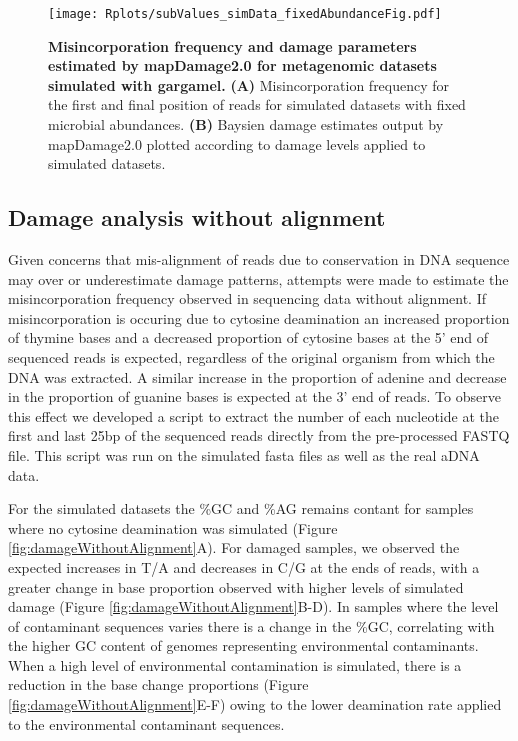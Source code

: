 \documentclass[12pt, a4paper]{article}
\begin{document}
\begin{figure}[ht!]
	\setlength{\abovecaptionskip}{6pt}
	\begin{center}
	\texttt{[image: Rplots/subValues\_simData\_fixedAbundanceFig.pdf]}
	\end{center}
	\small\caption[Misincorporation frequency and damage parameters estimated by mapDamage2.0 for metagenomic datasets simulated with gargamel.]{\textbf{Misincorporation frequency and damage parameters estimated by mapDamage2.0 for metagenomic datasets simulated with gargamel.} \textbf{(A)} Misincorporation frequency for the first and final position of reads for simulated datasets with fixed microbial abundances. \textbf{(B)} Baysien damage estimates output by mapDamage2.0 plotted according to damage levels applied to simulated datasets.}\label{fig:subValues_simDataFig}
\end{figure}
\clearpage

\subsection{Damage analysis without alignment}

Given concerns that mis-alignment of reads due to conservation in DNA sequence may over or underestimate damage patterns, attempts were made to estimate the misincorporation frequency observed in sequencing data without alignment. 
If misincorporation is occuring due to cytosine deamination an increased proportion of thymine bases and a decreased proportion of cytosine bases at the 5' end of sequenced reads is expected, regardless of the original organism from which the DNA was extracted. 
A similar increase in the proportion of adenine and decrease in the proportion of guanine bases is expected at the 3' end of reads. 
To observe this effect we developed a script to extract the number of each nucleotide at the first and last 25bp of the sequenced reads directly from the pre-processed FASTQ file. 
This script was run on the simulated fasta files as well as the real aDNA data.

For the simulated datasets the \%GC and \%AG remains contant for samples where no cytosine deamination was simulated (Figure \ref{fig:damageWithoutAlignment}A). 
For damaged samples, we observed the expected increases in T/A and decreases in C/G at the ends of reads, with a greater change in base proportion observed with higher levels of simulated damage (Figure \ref{fig:damageWithoutAlignment}B-D).
In samples where the level of contaminant sequences varies there is a change in the \%GC, correlating with the higher GC content of genomes representing environmental contaminants. 
When a high level of environmental contamination is simulated, there is a reduction in the base change proportions (Figure \ref{fig:damageWithoutAlignment}E-F) owing to the lower deamination rate applied to the environmental contaminant sequences.
\end{document}
